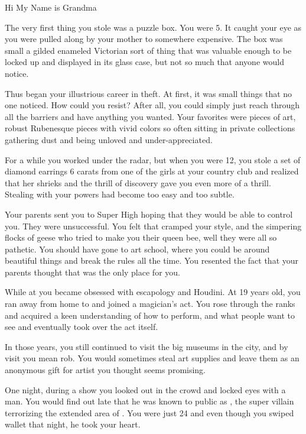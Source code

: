 \documentclass[char]{LRSguildcamp1}
\begin{document}
\name{\cGrandma{}}
Hi My Name is Grandma

The very first thing you stole was a puzzle box. You were 5. It caught your eye as you were pulled along by your mother to somewhere expensive. The box was small a gilded enameled Victorian sort of thing that was valuable enough to be locked up and displayed in its glass case, but not so much that anyone would notice. 

Thus began your illustrious career in theft. At first, it was small things that no one noticed. How could you resist? After all, you could simply just reach through all the barriers and have anything you wanted. Your favorites were pieces of art, robust Rubenesque pieces with vivid colors so often sitting in private collections gathering dust and being unloved and under-appreciated. 

For a while you worked under the radar,  but when you were 12, you stole a set of diamond earrings 6 carats from one of the girls at your country club and realized that her shrieks and the thrill of discovery gave you even more of a thrill. Stealing with your powers had become too easy and too subtle. 

Your parents sent you to Super High hoping that they would be able to control you. They were unsuccessful. You felt that \pSuperSchool{} cramped your style, and the simpering flocks of geese who tried to make you their queen bee, well they were all so pathetic. You should have gone to art school, where you could be around beautiful things and break the rules all the time. You resented the fact that your parents thought that \pSuperSchool{} was the only place for you. 

While at \pSuperSchool{} you became obsessed with escapology and Houdini. At 19 years old, you ran away from home to \pCityGrandma{} and joined a magician’s act. You rose through the ranks and acquired a keen understanding of how to perform, and what people want to see and eventually took over the act itself.  

In those years, you still continued to visit the big museums in the city, and by visit you mean rob. You would sometimes steal art supplies and leave them as an anonymous gift for artist you thought seems promising. 

One night, during a show you looked out in the crowd and locked eyes with a man. You would find out late that he was known to public as \cGS{}, the super villain terrorizing the extended area of \pCityO. You were just 24 and even though you swiped \cGS{\their} wallet that night, he took your heart.
\end{document}
